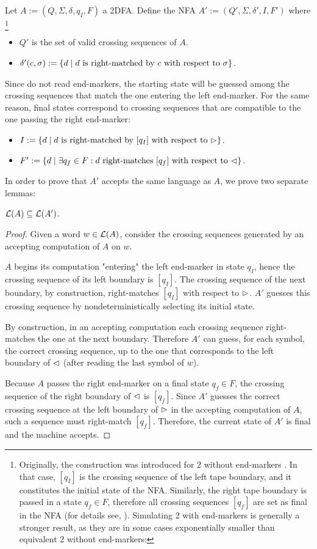 Let $A:=(Q,\Sigma,\delta,q_I,F)$ a 2DFA.
Define the NFA $A':=(Q',\Sigma,\delta',I,F')$ where%
\footnote{
	Originally, the construction was introduced for 2\DFAs{} without end-markers \cite{RabSco59}.
	In that case, $[q_I]$ is the crossing sequence of the left tape boundary, and it constitutes the initial state of the NFA.
	Similarly, the right tape boundary is passed in a state $q_f\in F$, therefore all crossing sequences $[q_f]$ are set as final in the NFA (for details see, \eg[,] \cite{HopUll79}).
	Simulating 2\DFAs{} with end-markers is generally a stronger result, as they are in some cases exponentially smaller than equivalent 2\DFAs{} without end-markers:
}
\begin{itemize}
	\item $Q'$ is the set of valid crossing sequences of $A$.
	\item $\delta'(c,\sigma):=\{d \mid \text{$d$ is right-matched by $c$ with respect to~$\sigma$}\}$.
\end{itemize}
Since \NFAs{} do not read end-markers, the starting state will be guessed among the crossing sequences that match the one entering the left end-marker.
For the same reason, final states correspond to crossing sequences that are compatible to the one passing the right end-marker:
\begin{itemize}
	\item $I:=\{d\mid \text{$d$ is right-matched by $[q_I]$ with respect to $\rhd$}\}$.
	\item $F':=\{d\mid \exists q_f\in F: \text{$d$ right-matches $[q_f]$ with respect to $\lhd$}\}$.
\end{itemize}

In order to prove that $A'$ accepts the same language as $A$, we prove two separate lemmas:
\begin{lemm}\label{lem:2DFAto1NFA-1}
	$\mathcal L(A)\subseteq\mathcal L(A')$.
\end{lemm}
\begin{proof}
	Given a word $w\in\mathcal L(A)$, consider the crossing sequences generated by an accepting computation of $A$ on $w$.

	$A$ begins its computation "entering" the left end-marker in state $q_I$, hence the crossing sequence of its left boundary is $[q_I]$.
	The crossing sequence of the next boundary, by construction, right-matches $[q_I]$ with respect to $\rhd$.
	$A'$ guesses this crossing sequence by nondeterministically selecting its initial state.

	By construction, in an accepting computation each crossing sequence right-matches the one at the next boundary.
	Therefore $A'$ can guess, for each symbol, the correct crossing sequence, up to the one that corresponds to the left boundary of $\lhd$ (after reading the last symbol of $w$).

	Because $A$ passes the right end-marker on a final state $q_f\in F$, the crossing sequence of the right boundary of $\lhd$ is $[q_f]$.
	Since $A'$ guesses the correct crossing sequence at the left boundary of $\rhd$ in the accepting computation of $A$, such a sequence must right-match $[q_f]$.
	Therefore, the current state of $A'$ is final and the machine accepts.
\end{proof}


